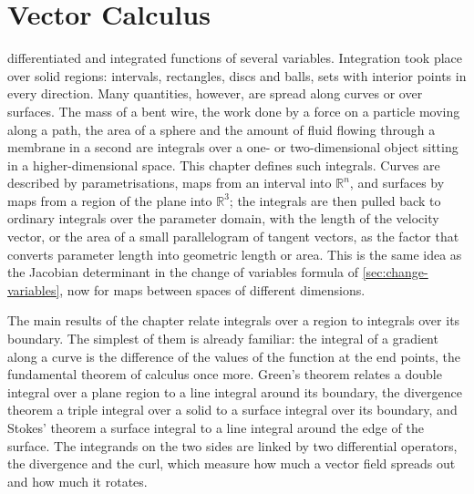 \chapter{Vector Calculus}
\label{ch:vector-calculus}


 differentiated and integrated functions of several variables. Integration took place over solid regions: intervals, rectangles, discs and balls, sets with interior points in every direction. Many quantities, however, are spread along curves or over surfaces. The mass of a bent wire, the work done by a force on a particle moving along a path, the area of a sphere and the amount of fluid flowing through a membrane in a second are integrals over a one- or two-dimensional object sitting in a higher-dimensional space. This chapter defines such integrals. Curves are described by parametrisations, maps from an interval into $\mathbb R^n$, and surfaces by maps from a region of the plane into $\mathbb R^3$; the integrals are then pulled back to ordinary integrals over the parameter domain, with the length of the velocity vector, or the area of a small parallelogram of tangent vectors, as the factor that converts parameter length into geometric length or area. This is the same idea as the Jacobian determinant in the change of variables formula of \cref{sec:change-variables}, now for maps between spaces of different dimensions.

The main results of the chapter relate integrals over a region to integrals over its boundary. The simplest of them is already familiar: the integral of a gradient along a curve is the difference of the values of the function at the end points, the fundamental theorem of calculus once more. Green's theorem relates a double integral over a plane region to a line integral around its boundary, the divergence theorem a triple integral over a solid to a surface integral over its boundary, and Stokes' theorem a surface integral to a line integral around the edge of the surface. The integrands on the two sides are linked by two differential operators, the divergence and the curl, which measure how much a vector field spreads out and how much it rotates.


